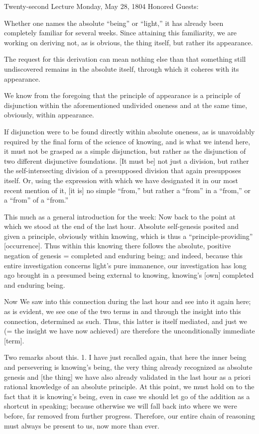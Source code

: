 Twenty-second Lecture
Monday, May 28, 1804
Honored Guests:

Whether one names the absolute “being” or “light,”
it has already been completely familiar for several weeks.
Since attaining this familiarity, we are working on
deriving not, as is obvious, the thing itself,
but rather its appearance.

The request for this derivation can mean nothing else than
that something still undiscovered remains in the absolute itself,
through which it coheres with its appearance.

We know from the foregoing
that the principle of appearance is
a principle of disjunction
within the aforementioned undivided oneness
and at the same time, obviously, within appearance.

If disjunction were to be found
directly within absolute oneness,
as is unavoidably required by
the final form of the science of knowing,
and is what we intend here,
it must not be grasped as a simple disjunction,
but rather as the disjunction of
two different disjunctive foundations.
[It must be] not just a division,
but rather the self-intersecting division
of a presupposed division
that again presupposes itself.
Or, using the expression with which we have designated it
in our most recent mention of it,
[it is] no simple “from,”
but rather a “from” in a “from,”
or a “from” of a “from.”

This much as a general introduction for the week:
Now back to the point at which we stood at the end of the last hour.
Absolute self-genesis posited and given a principle,
obviously within knowing,
which is thus a “principle-providing” [occurrence].
Thus within this knowing there follows
the absolute, positive negation of genesis =
completed and enduring being;
and indeed, because this entire investigation
concerns light's pure immanence,
our investigation has long ago brought in
a presumed being external to knowing,
knowing's [own] completed and enduring being.

Now We saw into this connection during the last hour
and see into it again here;
as is evident, we see one of the two terms
in and through the insight into this connection,
determined as such.
Thus, this latter is itself mediated,
and just we (= the insight we have now achieved) are
therefore the unconditionally immediate [term].

Two remarks about this.
1. I have just recalled again,
that here the inner being and persevering is knowing's being,
the very thing already recognized as absolute genesis
and [the thing] we have also already validated in the last hour
as a priori rational knowledge of an absolute principle.
At this point, we must hold on to
the fact that it is knowing's being,
even in case we should let go of
the addition as a shortcut in speaking;
because otherwise we will fall back into
where we were before, far removed from further progress.
Therefore, our entire chain of reasoning
must always be present to us, now more than ever.

